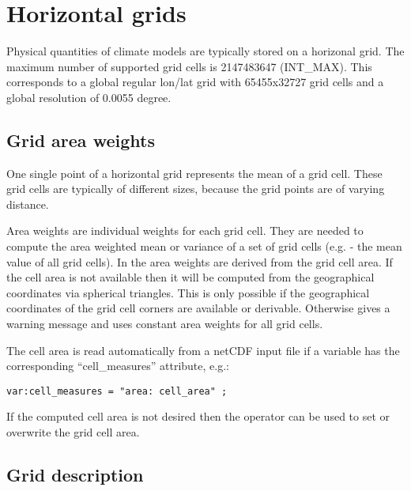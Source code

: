\section{Horizontal grids}
\label{HORIZONTAL_GRIDS}

Physical quantities of climate models are typically stored on a horizonal grid.
The maximum number of supported grid cells is 2147483647 (INT\_MAX).
This corresponds to a global regular lon/lat grid with 65455x32727
grid cells and a global resolution of 0.0055 degree.

\subsection{Grid area weights}
\label{GRID_AREA_WEIGHTS}

One single point of a horizontal grid represents the mean of a grid cell.
These grid cells are typically of different sizes, because the grid points are of varying distance.

Area weights are individual weights for each grid cell. 
They are needed to compute the area weighted mean or
variance of a set of grid cells (e.g.  - the mean value of all grid cells).
In {\CDO} the area weights are derived from the grid cell area.
If the cell area is not available then it will be computed from the geographical coordinates via spherical triangles.
This is only possible if the geographical coordinates of the grid cell corners are available or derivable.
Otherwise {\CDO} gives a warning message and uses constant area weights for all grid cells.

The cell area is read automatically from a netCDF input file if a variable has the
corresponding ``cell\_measures'' attribute, e.g.:

\begin{lstlisting}[frame=single, backgroundcolor=\color{pcolor1}, basicstyle=\small]
var:cell_measures = "area: cell_area" ;
\end{lstlisting}

If the computed cell area is not desired 
then the {\CDO} operator  can be used to
set or overwrite the grid cell area.

\subsection{Grid description}
\label{GRID_DESCRIPTION}

